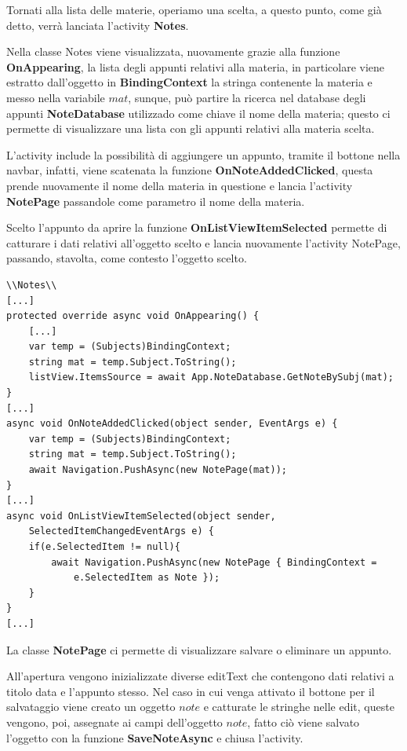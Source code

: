 \documentclass[a4paper, 50pt, twoside]{article}
\begin{document}
Tornati alla lista delle materie, operiamo una scelta, a questo punto, come già detto, verrà lanciata l'activity \textbf{Notes}.

Nella classe Notes viene visualizzata, nuovamente grazie alla funzione \textbf{OnAppearing}, la lista degli appunti relativi alla materia, in particolare viene estratto dall'oggetto in \textbf{BindingContext} la stringa contenente la materia e messo nella variabile $mat$, sunque, può partire la ricerca nel database degli appunti \textbf{NoteDatabase} utilizzado come chiave il nome della materia; questo ci permette di visualizzare una lista con gli appunti relativi alla materia scelta.

L'activity include la possibilità di aggiungere un appunto, tramite il bottone nella navbar, infatti, viene scatenata la funzione \textbf{OnNoteAddedClicked}, questa prende nuovamente il nome della materia in questione e lancia l'activity \textbf{NotePage} passandole come parametro il nome della materia.

Scelto l'appunto da aprire la funzione \textbf{OnListViewItemSelected} permette di catturare i dati relativi all'oggetto scelto e lancia nuovamente l'activity NotePage, passando, stavolta, come contesto l'oggetto scelto.

\begin{lstlisting}
\\Notes\\
[...]
protected override async void OnAppearing() {
	[...]
	var temp = (Subjects)BindingContext;
	string mat = temp.Subject.ToString();
	listView.ItemsSource = await App.NoteDatabase.GetNoteBySubj(mat);
}
[...]
async void OnNoteAddedClicked(object sender, EventArgs e) {
	var temp = (Subjects)BindingContext;
	string mat = temp.Subject.ToString();
	await Navigation.PushAsync(new NotePage(mat));
}
[...]
async void OnListViewItemSelected(object sender, 
	SelectedItemChangedEventArgs e) {
	if(e.SelectedItem != null){
		await Navigation.PushAsync(new NotePage { BindingContext =
			e.SelectedItem as Note });
	}
}
[...]
\end{lstlisting}

La classe \textbf{NotePage} ci permette di visualizzare salvare o eliminare un appunto.

All'apertura vengono inizializzate diverse editText che contengono dati relativi a titolo data e l'appunto stesso. Nel caso in cui venga attivato il bottone per il salvataggio viene creato un oggetto $note$ e catturate le stringhe nelle edit, queste vengono, poi, assegnate ai campi dell'oggetto $note$, fatto ciò viene salvato l'oggetto con la funzione \textbf{SaveNoteAsync} e chiusa l'activity.
\end{document}
